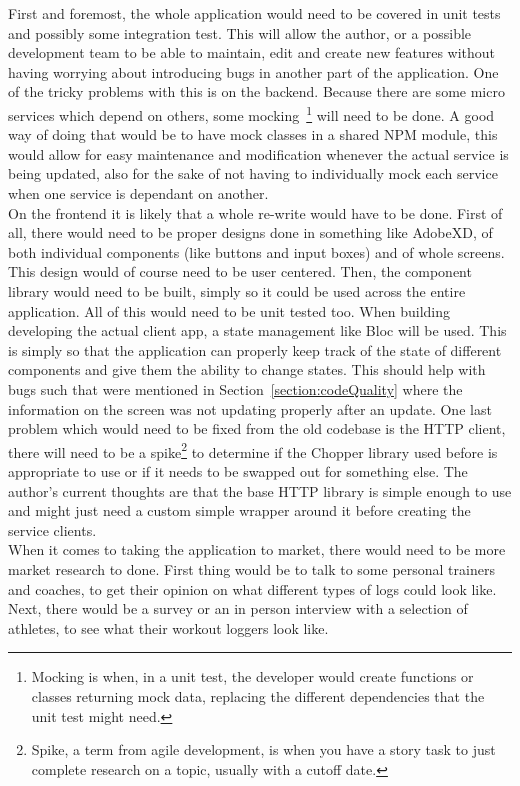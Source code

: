 \documentclass{article}
\begin{document}
\begin{multicols}{2}
First and foremost, the whole application would need to be covered in unit tests and possibly some integration test. This will allow the author, or a possible development team to be able to maintain, edit and create new features without having worrying about introducing bugs in another part of the application. One of the tricky problems with this is on the backend. Because there are some micro services which depend on others, some mocking~\footnote{Mocking is when, in a unit test, the developer would create functions or classes returning mock data, replacing the different dependencies that the unit test might need.} will need to be done. A good way of doing that would be to have mock classes in a shared NPM module, this would allow for easy maintenance and modification whenever the actual service is being updated, also for the sake of not having to individually mock each service when one service is dependant on another.\\
On the frontend it is likely that a whole re-write would have to be done. First of all, there would need to be proper designs done in something like AdobeXD\cite{adobexd}, of both individual components (like buttons and input boxes) and of whole screens. This design would of course need to be user centered. Then, the component library would need to be built, simply so it could be used across the entire application. All of this would need to be unit tested too. When building developing the actual client app, a state management like Bloc will be used. This is simply so that the application can properly keep track of the state of different components and give them the ability to change states. This should help with bugs such that were mentioned in Section~\ref{section:codeQuality} where the information on the screen was not updating properly after an update. One last problem which would need to be fixed from the old codebase is the HTTP client, there will need to be a spike\footnote{Spike, a term from agile development, is when you have a story task to just complete research on a topic, usually with a cutoff date.} to determine if the Chopper library used before is appropriate to use or if it needs to be swapped out for something else. The author's current thoughts are that the base HTTP library is simple enough to use and might just need a custom simple wrapper around it before creating the service clients.\\
When it comes to taking the application to market, there would need to be more market research to done. First thing would be to talk to some personal trainers and coaches, to get their opinion on what different types of logs could look like. Next, there would be a survey or an in person interview with a selection of athletes, to see what their workout loggers look like.\\

\end{multicols}
\end{document}
